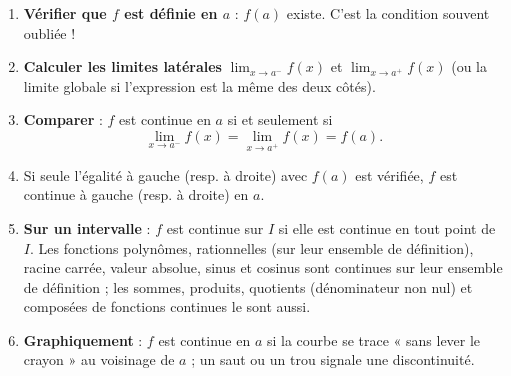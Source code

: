 \documentclass[11pt]{article}
\newcommand{\cle}[1]{{\popxbold\color{popdark}#1}}
\begin{document}
\begin{methode}
\begin{enumerate}
\item \textbf{Vérifier que $f$ est définie en $a$} : $f(a)$ existe. C'est la condition souvent oubliée !
\item \textbf{Calculer les limites latérales} $\lim_{x\to a^-}f(x)$ et $\lim_{x\to a^+}f(x)$ (ou la limite globale si l'expression est la même des deux côtés).
\item \textbf{Comparer} : $f$ est continue en $a$ si et seulement si
\[ \lim_{x\to a^-}f(x)=\lim_{x\to a^+}f(x)=f(a). \]
\item Si seule l'égalité à gauche (resp. à droite) avec $f(a)$ est vérifiée, $f$ est \cle{continue à gauche} (resp. \cle{à droite}) en $a$.
\item \textbf{Sur un intervalle} : $f$ est continue sur $I$ si elle est continue en tout point de $I$. Les fonctions polynômes, rationnelles (sur leur ensemble de définition), racine carrée, valeur absolue, sinus et cosinus sont continues sur leur ensemble de définition ; les sommes, produits, quotients (dénominateur non nul) et composées de fonctions continues le sont aussi.
\item \textbf{Graphiquement} : $f$ est continue en $a$ si la courbe se trace « sans lever le crayon » au voisinage de $a$ ; un saut ou un trou signale une discontinuité.
\end{enumerate}
\end{methode}
\end{document}

